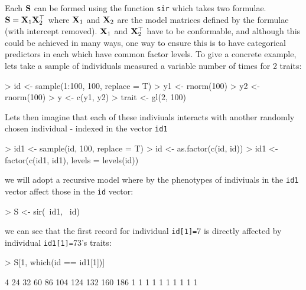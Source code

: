 \documentclass{article}
\begin{document}
Each ${\bf S}$ can be formed using the function \texttt{sir} which takes two formulae. ${\bf S} = {\bf X}_{1}{\bf X}_{2}^{\top}$ where ${\bf X}_{1}$ and ${\bf X}_{2}$ are the model matrices defined by the formulae (with intercept removed).  ${\bf X}_{1}$ and ${\bf X}_{2}^{\top}$ have to be conformable, and although this could be achieved in many ways, one way to ensure this is to have categorical predictors in each which have common factor levels.  To give a concrete example, lets take a sample of individuals measured a variable number of times for 2 traits: 

\begin{Schunk}
\begin{Sinput}
> id <- sample(1:100, 100, replace = T)
> y1 <- rnorm(100)
> y2 <- rnorm(100)
> y <- c(y1, y2)
> trait <- gl(2, 100)
\end{Sinput}
\end{Schunk}


Lets then imagine that each of these indiviuals interacts with another randomly chosen individual - indexed in the vector \texttt{id1}

\begin{Schunk}
\begin{Sinput}
> id1 <- sample(id, 100, replace = T)
> id <- as.factor(c(id, id))
> id1 <- factor(c(id1, id1), levels = levels(id))
\end{Sinput}
\end{Schunk}

we will adopt a recursive model where by the phenotypes of indiviuals in the \texttt{id1} vector affect those in the \texttt{id} vector:

\begin{Schunk}
\begin{Sinput}
> S <- sir(~id1, ~id)
\end{Sinput}
\end{Schunk}

we can see that the first record for individual \texttt{id[1]=}7 is directly affected by individual \texttt{id1[1]=}73's traits:

\begin{Schunk}
\begin{Sinput}
> S[1, which(id == id1[1])]
\end{Sinput}
\begin{Soutput}
  4  24  32  60  86 104 124 132 160 186 
  1   1   1   1   1   1   1   1   1   1 
\end{Soutput}
\end{Schunk}
\end{document}
